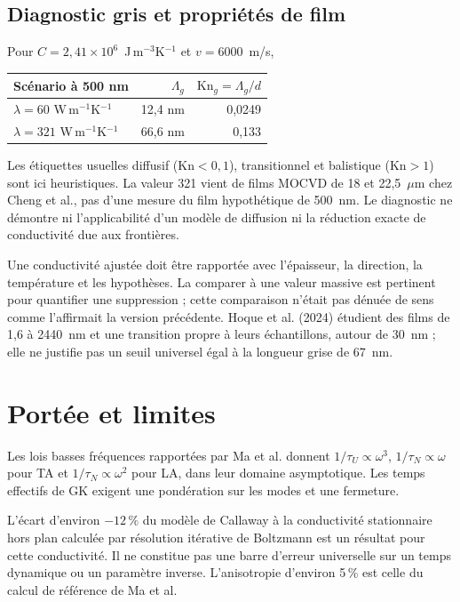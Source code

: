 \documentclass[11pt,a4paper]{article}
\begin{document}
\subsection{Diagnostic gris et propriétés de film}
Pour $C=2{,}41\times10^6$~J\,m$^{-3}$K$^{-1}$ et $v=6000$~m/s,
\begin{center}
\begin{tabular}{@{}lrr@{}}
\toprule
Scénario à 500 nm & $\Lambda_g$ & $\mathrm{Kn}_g=\Lambda_g/d$ \\
\midrule
$\lambda=60$ W\,m$^{-1}$K$^{-1}$ & 12,4 nm & 0,0249 \\
$\lambda=321$ W\,m$^{-1}$K$^{-1}$ & 66,6 nm & 0,133 \\
\bottomrule
\end{tabular}
\end{center}
Les étiquettes usuelles diffusif ($\mathrm{Kn}<0{,}1$), transitionnel et
balistique ($\mathrm{Kn}>1$) sont ici heuristiques.
La valeur 321 vient de films MOCVD de 18 et 22,5~$\mu$m chez Cheng et al.,
pas d'une mesure du film hypothétique de 500~nm.
Le diagnostic ne démontre ni l'applicabilité d'un modèle de diffusion ni
la réduction exacte de conductivité due aux frontières.

Une conductivité ajustée doit être rapportée avec l'épaisseur, la direction,
la température et les hypothèses. La comparer à une valeur massive est
pertinent pour quantifier une suppression ; cette comparaison n'était pas
dénuée de sens comme l'affirmait la version précédente.
Hoque et al. (2024) étudient des films de 1,6 à 2440~nm et une transition
propre à leurs échantillons, autour de 30~nm ; elle ne justifie pas un seuil
universel égal à la longueur grise de 67~nm.

\section{Portée et limites}
Les lois basses fréquences rapportées par Ma et al. donnent
$1/\tau_U\propto\omega^3$, $1/\tau_N\propto\omega$ pour TA et
$1/\tau_N\propto\omega^2$ pour LA, dans leur domaine asymptotique.
Les temps effectifs de GK exigent une pondération sur les modes et une fermeture.

L'écart d'environ $-12\,\%$ du modèle de Callaway à la conductivité
stationnaire hors plan calculée par résolution itérative de Boltzmann
est un résultat pour cette conductivité. Il ne constitue pas une barre
d'erreur universelle sur un temps dynamique ou un paramètre inverse.
L'anisotropie d'environ 5\,\% est celle du calcul de référence de Ma et al.
\end{document}
